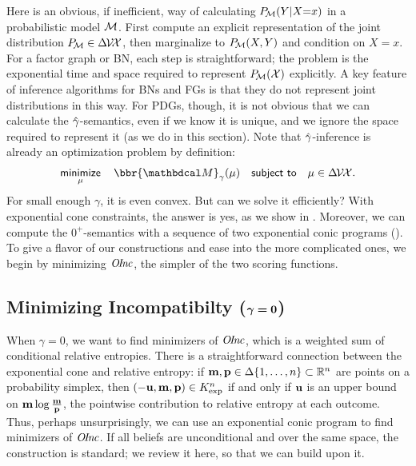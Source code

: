 Here is an obvious, if inefficient,
way
of calculating
$\Pr_{\!\cal M}(Y|X{=}x)$ in a
probabilistic model $\cal M$. 
First compute an explicit representation of the joint distribution 
$\Pr_{\!\cal M} \in \Delta\mskip-2mu\V\!\X$, 
then marginalize to 
$\Pr_{\!\cal M}(X,Y)$ and condition on $X{=}x$.
For a factor graph or BN,
each step is
straightforward;
the problem is the exponential time and space required to represent $\Pr_{\!\cal M}(\X)$ explicitly.
A key feature of inference algorithms for BNs and FGs is that they
do not represent joint distributions in this way.
For PDGs, though, it is not
obvious that
we can calculate the $\zogamma$-semantics,
even if
we know it is unique, and
we ignore the space required to represent it (as we do in this section).
Note that $\zogamma$-inference is already an optimization problem by definition:
\[
    \minimize_\mu\quad
        \bbr{\dg M}_\gamma(\mu)
    \quad \subjto\quad \mu \in \Delta\mskip-2mu\V\mskip-2mu\X.
\]
For small enough 
 $\gamma$,
it is even convex.
But can we solve it efficiently?
With exponential cone constraints,
the answer is yes, as we show in .
Moreover, we can compute the $0^+$\!-semantics with a sequence of two exponential conic programs ().
To give a flavor of our constructions and ease into
the more complicated ones, we begin by 
minimizing
 $\OInc$, the simpler of the two scoring functions.



\subsection{%
    Minimizing Incompatibilty
    (\texorpdfstring{$\boldsymbol\gamma\boldsymbol=\mat0$}{gamma=0})%
} \label{sec:minimize-inc}

When $\gamma = 0$, we want to find minimizers of $\OInc$,
which is a
weighted sum of conditional relative entropies.
There is a straightforward connection between the exponential cone and
relative entropy:
if $\mat m, \mat p \in
\Delta \{1, \ldots, n\}
\subset \mathbb R^n$ are points on
a probability simplex,
then $(-\mat u, \mat m, \mat p) \in K_{\exp}^n$ if and only if
$\mat u$ is an upper bound on $\mat m \log \frac{\mat m}{\mat p}$,
the pointwise contribution to relative entropy at each outcome.
Thus, perhaps unsurprisingly, we can use an exponential conic program to
find minimizers of $\OInc$.
If all beliefs are unconditional and over the same space,
the construction is standard;
we review it here, so that we can build upon it.

